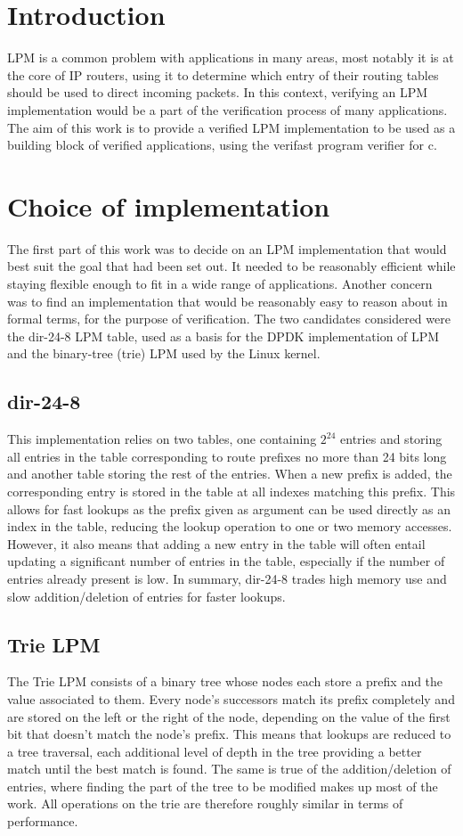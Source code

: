 \documentclass{article}
\begin{document}
\section{Introduction}
LPM is a common problem with applications in many areas, most notably it is at the
core of IP routers, using it to determine which entry of their routing tables should
be used to direct incoming packets. In this context, verifying an LPM implementation
would be a part of the verification process of many applications. The aim of this
work is to provide a verified LPM implementation to be used as a building block of
verified applications, using the verifast program verifier for c.
\section{Choice of implementation}
The first part of this work was to decide on an LPM implementation that would best
suit the goal that had been set out. It needed to be reasonably efficient while staying
flexible enough to fit in a wide range of applications. Another concern was to find
an implementation that would be reasonably easy to reason about in formal terms, for
the purpose of verification. The two candidates considered were the dir-24-8 LPM
table, used as a basis for the DPDK implementation of LPM and the binary-tree (trie)
LPM used by the Linux kernel.
\subsection{dir-24-8}
This implementation relies on two tables, one containing $2^{24}$ entries and storing
all entries in the table corresponding to route prefixes no more than 24 bits long
and another table storing the rest of the entries. When a new prefix is added, the
corresponding entry is stored in the table at all indexes matching this prefix. This
allows for fast lookups as the prefix given as argument can be used directly as an
index in the table, reducing the lookup operation to one or two memory accesses.
However, it also means that adding a new entry in the table will often entail updating
a significant number of entries in the table, especially if the number of entries
already present is low. In summary, dir-24-8 trades high memory use and slow
addition/deletion of entries for faster lookups.
\subsection{Trie LPM}
The Trie LPM consists of a binary tree whose nodes each store a prefix and the value
associated to them. Every node's successors match its prefix completely and are
stored on the left or the right of the node, depending on the value of the first bit
that doesn't match the node's prefix. This means that lookups are reduced to a tree
traversal, each additional level of depth in the tree providing a better match until
the best match is found. The same is true of the addition/deletion of entries, where
finding the part of the tree to be modified makes up most of the work. All operations
on the trie are therefore roughly similar in terms of performance.
\end{document}
